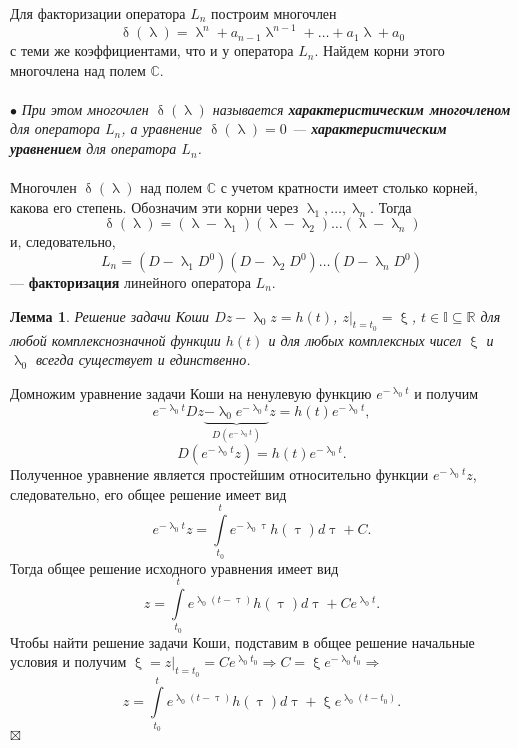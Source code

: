 \documentclass[a4paper, 12pt]{report}
\newenvironment{Proof} %
{\par\noindent{$\blacklozenge$}} %
{\hfill$\scriptstyle\boxtimes$}
\renewcommand{\delta}{\updelta}
\renewcommand{\lambda}{\uplambda}
\renewcommand{\xi}{\upxi}
\begin{document}
	Для факторизации оператора $L_n$ построим многочлен $$\delta(\lambda) = \lambda^n+a_{n-1}\lambda^{n-1} + \ldots + a_1\lambda + a_0$$ с теми же коэффициентами, что и у оператора $L_n$. Найдем корни этого многочлена над полем $\mathbb{C}$.\\\\
	$\bullet$ \textit{При этом многочлен $\delta(\lambda)$ называется \textbf{характеристическим многочленом} для оператора $L_n$, а уравнение $\delta(\lambda) = 0$ --- \textbf{характеристическим уравнением} для оператора $L_n$.}\\\\
	Многочлен $\delta(\lambda)$ над полем $\mathbb{C}$ с учетом кратности имеет столько корней, какова его степень. Обозначим эти корни через $\lambda_1,\ldots, \lambda_n$. Тогда $$\delta(\lambda) = (\lambda - \lambda_1)(\lambda-\lambda_2)\ldots(\lambda - \lambda_n)$$ и, следовательно, $$L_n = (D-\lambda_1D^0)(D-\lambda_2D^0)\ldots(D-\lambda_nD^0)$$ --- \textbf{факторизация} линейного оператора $L_n$.
	\newtheorem*{2_1_1}{Лемма}\begin{2_1_1}Решение задачи Коши $Dz - \lambda_0z = h(t)$, $z|_{t=t_0} = \xi$, $t\in\mathbb{I}\subseteq\mathbb{R}$ для любой комплекснозначной функции $h(t)$ и для любых комплексных чисел $\xi$ и $\lambda_0$ всегда существует и единственно.
	\end{2_1_1}\begin{Proof}
		Домножим уравнение задачи Коши на ненулевую функцию $e^{-\lambda_0t}$ и получим $$e^{-\lambda_0t}Dz \underbrace{ - \lambda_0 e^{-\lambda_0t}}_{D(e^{-\lambda_0t})}z = h(t) e^{-\lambda_0t},$$
		$$D(e^{-\lambda_0t}z)=h(t)e^{-\lambda_0t}.$$ Полученное уравнение является простейшим относительно функции $e^{-\lambda_0t}z$, следовательно, его общее решение имеет вид $$e^{-\lambda_0t}z = \int\limits_{t_0}^te^{-\lambda_0\uptau}h(\uptau)d\uptau + C.$$ Тогда общее решение исходного уравнения имеет вид $$z = \int\limits_{t_0}^te^{\lambda_0(t-\uptau)}h(\uptau)d\uptau + Ce^{\lambda_0t}.$$ Чтобы найти решение задачи Коши, подставим в общее решение начальные условия и получим $\xi = z|_{t=t_0} = Ce^{\lambda_0t_0}\Rightarrow C = \xi e^{-\lambda_0t_0}\Rightarrow$ $$z = \int\limits_{t_0}^te^{\lambda_0(t-\uptau)}h(\uptau)d\uptau + \xi e^{\lambda_0(t-t_0)}.$$
	\end{Proof}
\end{document}
